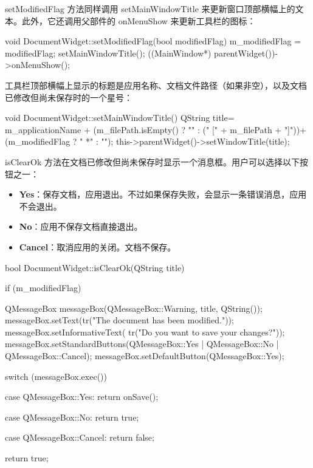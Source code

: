 setModifiedFlag 方法同样调用 setMainWindowTitle 来更新窗口顶部横幅上的文本。此外，它还调用父部件的 onMenuShow 来更新工具栏的图标：

\begin{codebox}
void DocumentWidget::setModifiedFlag(bool modifiedFlag) {
  m_modifiedFlag = modifiedFlag;
  setMainWindowTitle();
  ((MainWindow*) parentWidget())->onMenuShow();
}
\end{codebox}

工具栏顶部横幅上显示的标题是应用名称、文档文件路径（如果非空），以及文档已修改但尚未保存时的一个星号：

\begin{codebox}
void DocumentWidget::setMainWindowTitle() {
  QString title= m_applicationName +
          (m_filePath.isEmpty() ? "" : (" [" + m_filePath + "]"))+
          (m_modifiedFlag ? " *" : "");
  this->parentWidget()->setWindowTitle(title);
}
\end{codebox}

isClearOk 方法在文档已修改但尚未保存时显示一个消息框。用户可以选择以下按钮之一：

\begin{itemize}
\item \textbf{Yes}：保存文档，应用退出。不过如果保存失败，会显示一条错误消息，应用不会退出。
\item \textbf{No}：应用不保存文档直接退出。
\item \textbf{Cancel}：取消应用的关闭。文档不保存。
\end{itemize}

\begin{codebox}
bool DocumentWidget::isClearOk(QString title) {
  if (m_modifiedFlag) {
    QMessageBox messageBox(QMessageBox::Warning,
                           title, QString());
    messageBox.setText(tr("The document has been modified."));
    messageBox.setInformativeText(
               tr("Do you want to save your changes?"));
    messageBox.setStandardButtons(QMessageBox::Yes |
                          QMessageBox::No | QMessageBox::Cancel);
    messageBox.setDefaultButton(QMessageBox::Yes);

    switch (messageBox.exec()) {
      case QMessageBox::Yes:
        return onSave();

      case QMessageBox::No:
        return true;

      case QMessageBox::Cancel:
        return false;
    }
  }

  return true;
}
\end{codebox}

